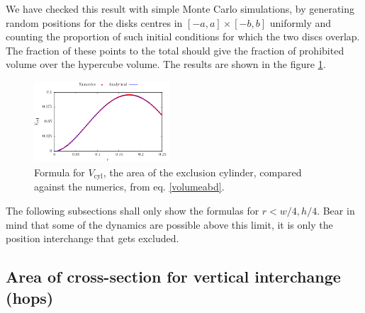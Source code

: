 \documentclass[letterpaper,10pt, jcp, aps]{revtex4-1}
\begin{document}



We have checked this result with simple Monte Carlo simulations, 
by generating random positions for the disks centres in 
$[-a,a] \times [-b,b]$ uniformly and 
counting the proportion of such initial conditions for 
which the two discs overlap. The fraction of these points to the 
total should give the fraction of prohibited volume over the hypercube
volume. The results are shown in the figure \ref{VolMonteC}.

\begin{figure}[h]
\centering
\includegraphics[width=0.45\textwidth]{./FigurasPerfectas/VolCyl02.pdf}
\caption{Formula for $V_\text{cyl}$, the area of the exclusion cylinder, compared
against the numerics, from eq. \ref{volumeabd}.
 }\label{VolMonteC}
\end{figure}

The following subsections shall only show the formulas for $r<w/4, h/4$.
Bear in mind that some of the dynamics are possible above this limit,
it is only the position interchange that gets excluded. \\



\subsection{Area of cross-section for
 vertical interchange (hops)}\label{areahop}
\end{document}
